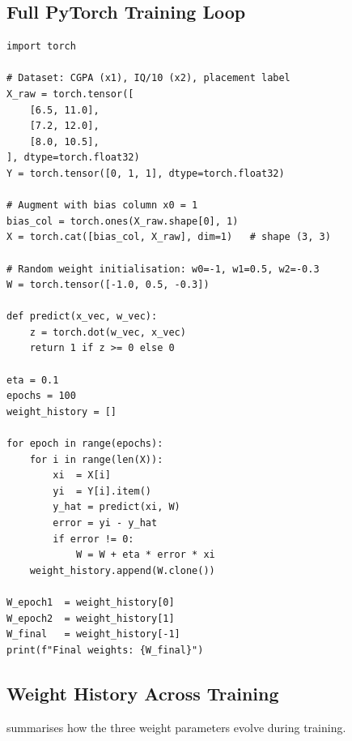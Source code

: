 \documentclass[12pt,a4paper]{article}
\begin{document}
\subsection{Full PyTorch Training Loop}
\label{subsec:training-loop}

\begin{lstlisting}[style=python, caption={Full perceptron training loop with weight history (V20 -- 01:01:00)}, label={lst:training-loop}]
import torch

# Dataset: CGPA (x1), IQ/10 (x2), placement label
X_raw = torch.tensor([
    [6.5, 11.0],
    [7.2, 12.0],
    [8.0, 10.5],
], dtype=torch.float32)
Y = torch.tensor([0, 1, 1], dtype=torch.float32)

# Augment with bias column x0 = 1
bias_col = torch.ones(X_raw.shape[0], 1)
X = torch.cat([bias_col, X_raw], dim=1)   # shape (3, 3)

# Random weight initialisation: w0=-1, w1=0.5, w2=-0.3
W = torch.tensor([-1.0, 0.5, -0.3])

def predict(x_vec, w_vec):
    z = torch.dot(w_vec, x_vec)
    return 1 if z >= 0 else 0

eta = 0.1
epochs = 100
weight_history = []

for epoch in range(epochs):
    for i in range(len(X)):
        xi  = X[i]
        yi  = Y[i].item()
        y_hat = predict(xi, W)
        error = yi - y_hat
        if error != 0:
            W = W + eta * error * xi
    weight_history.append(W.clone())

W_epoch1  = weight_history[0]
W_epoch2  = weight_history[1]
W_final   = weight_history[-1]
print(f"Final weights: {W_final}")
\end{lstlisting}

\subsection{Weight History Across Training}
\label{subsec:weight-history}

 summarises how the three weight parameters
evolve during training.
\end{document}
